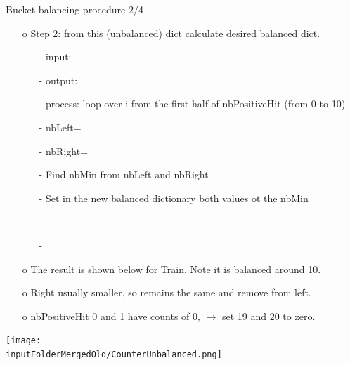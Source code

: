 \documentclass{beamer}
\begin{document}
\begin{frame}{Bucket balancing procedure 2/4}
\begin{enumerate}
\item[o] Step 2: from this (unbalanced) dict calculate desired balanced dict. 
\begin{enumerate}
\item[-] input: \texttt{}
\item[-] output: \texttt{}
\item[-] process: loop over i from the first half of nbPositiveHit (from 0 to 10)
\item[-] nbLeft=\texttt{}
\item[-] nbRight=\texttt{}
\item[-] Find nbMin from nbLeft and nbRight
\item[-] Set in the new balanced dictionary both values ot the nbMin
\item[-] \texttt{}
\item[-]\texttt{}
\end{enumerate}
\item[o] The result is shown below for Train. Note it is balanced around 10. 
\item[o] Right usually smaller, so remains the same and remove from left.
\item[o] nbPositiveHit 0 and 1 have counts of 0, $\rightarrow$ set 19 and 20 to zero.
\end{enumerate}
\centering
\texttt{[image: \\inputFolderMergedOld/CounterUnbalanced.png]}
\end{frame}
\end{document}
